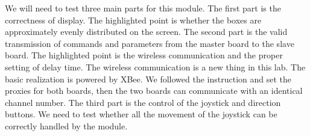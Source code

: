 We will need to test three main parts for this module. The first part is the correctness of display. The highlighted point is whether the boxes are approximately evenly distributed on the screen. The second part is the valid transmission of commands and parameters from the master board to the slave board. The highlighted point is the wireless communication and the proper setting of delay time. The wireless communication is a new thing in this lab. The basic realization is powered by XBee. We followed the instruction and set the proxies for both boards, then the two boards can communicate with an identical channel number. The third part is the control of the joystick and direction buttons. We need to test whether all the movement of the joystick can be correctly handled by the module.